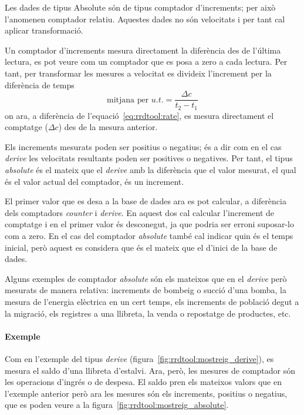 Les dades de tipus Absolute són de tipus comptador d'increments; per això l'anomenen comptador relatiu. Aquestes dades no són velocitats i per tant cal aplicar transformació. 

Un comptador d'increments mesura directament la diferència des de l'última lectura, es pot veure com un comptador que es posa a zero a cada lectura. Per tant, per transformar les mesures a velocitat es divideix l'increment per la diferència de temps
$$
\text{mitjana per }u.t. =\frac{\Delta c}{t_2-t_1}
$$
on ara, a diferència de l'equació~\ref{eq:rrdtool:rate}, es mesura directament el comptatge ($\Delta c$) des de la mesura anterior.

Els increments mesurats poden ser positius o negatius; és a dir com en el cas \emph{derive} les velocitats resultants poden ser positives o negatives. Per tant, el tipus \emph{absolute} és el mateix que el \emph{derive} amb la diferència que el valor mesurat, el qual és el valor actual del comptador,  és un increment.

El primer valor que es desa a la base de dades ara es pot calcular, a diferència dels comptadors \emph{counter} i \emph{derive}. En aquest dos cal calcular l'increment de comptatge i en el primer valor és desconegut, ja que podria ser erroni suposar-lo com a zero. En el cas del comptador \emph{absolute} també cal indicar quin és el temps inicial, però aquest es considera que és el mateix que el d'inici de la base de dades.

Alguns exemples de comptador \emph{absolute} són els mateixos que en el \emph{derive} però mesurats de manera relativa: increments de bombeig o succió d'una bomba, la mesura de l'energia elèctrica en un cert temps, els increments de població degut a la migració, els registres a una llibreta, la venda o repostatge de productes, etc.

\paragraph{Exemple} Com en l'exemple del tipus \emph{derive} (figura~\ref{fig:rrdtool:mostreig_derive}), es mesura el saldo d'una llibreta d'estalvi. Ara, però, les mesures de comptador són les operacions d'ingrés o de despesa. El saldo pren els mateixos valors que en l'exemple anterior però ara les mesures són els increments, positius o negatius, que es poden veure a la figura~\ref{fig:rrdtool:mostreig_absolute}. 

